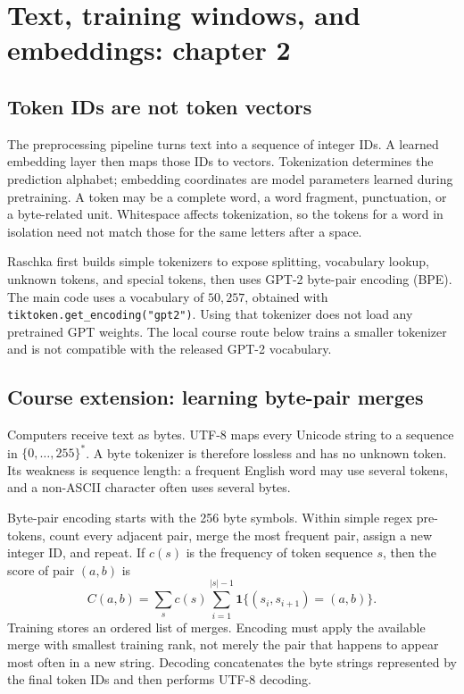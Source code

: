\documentclass[11pt]{article}
\begin{document}
\section{Text, training windows, and embeddings: chapter 2}
\label{sec:text}

\subsection{Token IDs are not token vectors}
The preprocessing pipeline turns text into a sequence of integer IDs. A learned
embedding layer then maps those IDs to vectors. Tokenization determines the
prediction alphabet; embedding coordinates are model parameters learned during
pretraining. A token may be a complete word, a word fragment, punctuation, or a
byte-related unit. Whitespace affects tokenization, so the tokens for a word in
isolation need not match those for the same letters after a space.

Raschka first builds simple tokenizers to expose splitting, vocabulary lookup,
unknown tokens, and special tokens, then uses GPT-2 byte-pair encoding (BPE).
The main code uses a vocabulary of $50{,}257$, obtained with
\texttt{tiktoken.get\_encoding("gpt2")}. Using that tokenizer does not load
any pretrained GPT weights.
The local course route below trains a smaller tokenizer and is not compatible
with the released GPT-2 vocabulary.

\subsection{Course extension: learning byte-pair merges}

Computers receive text as bytes. UTF-8 maps every Unicode string to a sequence
in $\{0,\ldots,255\}^*$. A byte tokenizer is therefore lossless and has no
unknown token. Its weakness is sequence length: a frequent English word may use
several tokens, and a non-ASCII character often uses several bytes.

Byte-pair encoding starts with the 256 byte symbols. Within simple regex
pre-tokens, count every adjacent pair, merge the most frequent pair, assign a new
integer ID, and repeat. If $c(s)$ is the frequency of token sequence $s$, then
the score of pair $(a,b)$ is
\[
C(a,b)=\sum_s c(s)\sum_{i=1}^{|s|-1}
\mathbf{1}\{(s_i,s_{i+1})=(a,b)\}.
\]
Training stores an ordered list of merges. Encoding must apply the available
merge with smallest training rank, not merely the pair that happens to appear
most often in a new string. Decoding concatenates the byte strings represented
by the final token IDs and then performs UTF-8 decoding.
\end{document}
